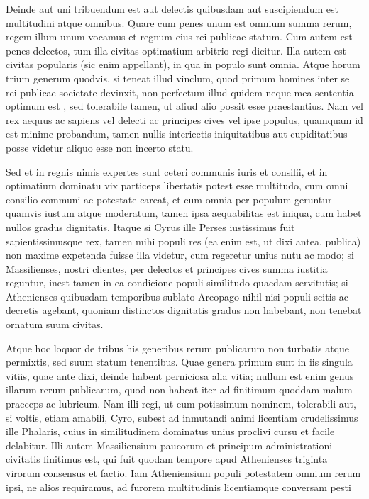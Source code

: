  Deinde aut uni tribuendum est aut delectis quibusdam aut suscipiendum est multitudini atque omnibus. Quare cum penes unum est omnium summa rerum, regem illum unum vocamus et regnum eius rei publicae statum. Cum autem est penes delectos, tum illa civitas optimatium arbitrio regi dicitur. Illa autem est civitas popularis (sic enim appellant), in qua in populo sunt omnia. Atque horum trium generum quodvis, si teneat illud vinclum, quod primum homines inter se rei publicae societate devinxit, non perfectum illud quidem neque mea sententia optimum est , sed tolerabile tamen, ut aliud alio possit esse praestantius. Nam vel rex aequus ac sapiens vel delecti ac principes cives vel ipse populus, quamquam id est minime probandum, tamen nullis interiectis iniquitatibus aut cupiditatibus posse videtur aliquo esse non incerto statu.

 Sed et in regnis nimis expertes sunt ceteri communis iuris et consilii, et in optimatium dominatu vix particeps libertatis potest esse multitudo, cum omni consilio communi ac potestate careat, et cum omnia per populum geruntur quamvis iustum atque moderatum, tamen ipsa aequabilitas est iniqua, cum habet nullos gradus dignitatis. Itaque si Cyrus ille Perses iustissimus fuit sapientissimusque rex, tamen mihi populi res (ea enim est, ut dixi antea, publica) non maxime expetenda fuisse illa videtur, cum regeretur unius nutu ac modo; si Massilienses, nostri clientes, per delectos et principes cives summa iustitia reguntur, inest tamen in ea condicione populi similitudo quaedam servitutis; si Athenienses quibusdam temporibus sublato Areopago nihil nisi populi scitis ac decretis agebant, quoniam distinctos dignitatis gradus non habebant, non tenebat ornatum suum civitas.

 Atque hoc loquor de tribus his generibus rerum publicarum non turbatis atque permixtis, sed suum statum tenentibus. Quae genera primum sunt in iis singula vitiis, quae ante dixi, deinde habent perniciosa alia vitia; nullum est enim genus illarum rerum publicarum, quod non habeat iter ad finitimum quoddam malum praeceps ac lubricum. Nam illi regi, ut eum potissimum nominem, tolerabili aut, si voltis, etiam amabili, Cyro, subest ad inmutandi animi licentiam crudelissimus ille Phalaris, cuius in similitudinem dominatus unius proclivi cursu et facile delabitur. Illi autem Massiliensium paucorum et principum administrationi civitatis finitimus est, qui fuit quodam tempore apud Athenienses triginta virorum consensus et factio. Iam Atheniensium populi potestatem omnium rerum ipsi, ne alios requiramus, ad furorem multitudinis licentiamque conversam pesti

